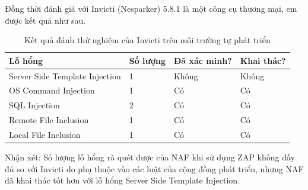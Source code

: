 \documentclass[./../main.tex]{subfiles}
\begin{document}
Đồng thời đánh giá với Invicti (Nesparker) 5.8.1 là một công cụ thương mại,
em được kết quả như sau.
\begin{table}[H]
	\begin{tabular}{|l|l|l|l|}
		\hline
		\textbf{Lỗ hổng}               & \textbf{Số lượng} & \textbf{Đã xác minh?} & \textbf{Khai thác?} \\ \hline
		Server Side Template Injection & 1                 & Không                 & Không               \\ \hline
		OS Command Injection           & 1                 & Có                    & Có                  \\ \hline
		SQL Injection                  & 2                 & Có                    & Có                  \\ \hline
		Remote File Inclusion          & 1                 & Có                    & Có                  \\ \hline
		Local File Inclusion           & 1                 & Có                    & Có                  \\ \hline
	\end{tabular}
	\caption{Kết quả đánh thử nghiệm của Invicti trên môi trường tự phát triển}

\end{table}

Nhận xét: Số lượng lỗ hổng rà quét được của NAF khi sử dụng ZAP không đầy đủ so với Invicti do phụ thuộc vào các luật của cộng đồng phát triển, nhưng NAF đã khai thác tốt hơn với lỗ hổng Server Side Template Injection.






\end{document}
